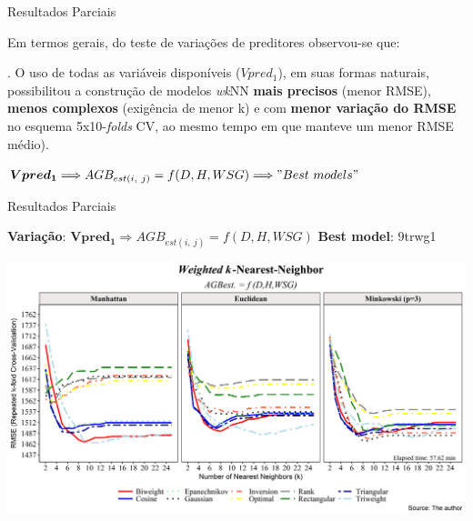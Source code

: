\documentclass[12pt,ignorenonframetext,aspectratio=1610]{beamer}
\begin{document}

\begin{frame}[c]{Resultados Parciais}
	
	Em termos gerais, do teste de variações de preditores observou-se que: \newline
	
	. O uso de todas as variáveis disponíveis ($Vpred_1$), em suas formas naturais, possibilitou a construção de modelos \textit{wk}NN \textbf{mais precisos} (menor RMSE), \textbf{menos complexos} (exigência de menor k) e com \textbf{menor variação do RMSE} no esquema 5x10-\textit{folds} CV, ao mesmo tempo em que manteve um menor RMSE médio). \newline
	
	\centering
	$\boldsymbol{Vpred_1} \Longrightarrow {AGB_{est(i,\ j)}} = f(D, H, WSG) \Longrightarrow "Best\ models"$
	
\end{frame}


\begin{frame}[c]{Resultados Parciais}
	
		\textbf{Variação}: $\boldsymbol{Vpred_1} \Longrightarrow {AGB_{est(i,\ j)}} = f(D, H, WSG)$ \newline
		\textbf{Best model}: 9trwg1
		
	\begin{center}
		\includegraphics[scale=0.5]{Fig/Figura4A1}
	\end{center}
	
\end{frame}

\end{document}
